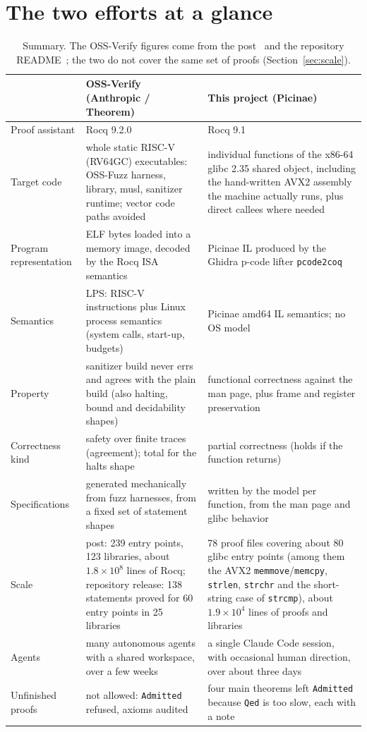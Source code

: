 \documentclass[11pt]{article}
\newcommand{\code}[1]{\texttt{#1}}
\begin{document}
\section{The two efforts at a glance}\label{sec:glance}

\begin{table}[h]
\centering\small
\begin{tabularx}{\textwidth}{@{}lXX@{}}
\toprule
 & OSS-Verify (Anthropic / Theorem) & This project (Picinae) \\
\midrule
Proof assistant & Rocq 9.2.0 & Rocq 9.1 \\
Target code & whole static RISC-V (RV64GC) executables: OSS-Fuzz harness, library, musl, sanitizer runtime; vector code paths avoided & individual functions of the x86-64 glibc 2.35 shared object, including the hand-written AVX2 assembly the machine actually runs, plus direct callees where needed \\
Program representation & ELF bytes loaded into a memory image, decoded by the Rocq ISA semantics & Picinae IL produced by the Ghidra p-code lifter \texttt{pcode2coq} \\
Semantics & LPS: RISC-V instructions plus Linux process semantics (system calls, start-up, budgets) & Picinae amd64 IL semantics; no OS model \\
Property & sanitizer build never errs and agrees with the plain build (also halting, bound and decidability shapes) & functional correctness against the man page, plus frame and register preservation \\
Correctness kind & safety over finite traces (agreement); total for the halts shape & partial correctness (holds if the function returns) \\
Specifications & generated mechanically from fuzz harnesses, from a fixed set of statement shapes & written by the model per function, from the man page and glibc behavior \\
Scale & post: 239 entry points, 123 libraries, about $1.8\times10^8$ lines of Rocq; repository release: 138 statements proved for 60 entry points in 25 libraries & 78 proof files covering about 80 glibc entry points (among them the AVX2 \code{memmove}/\code{memcpy}, \code{strlen}, \code{strchr} and the short-string case of \code{strcmp}), about $1.9\times10^4$ lines of proofs and libraries \\
Agents & many autonomous agents with a shared workspace, over a few weeks & a single Claude Code session, with occasional human direction, over about three days \\
Unfinished proofs & not allowed: \code{Admitted} refused, axioms audited & four main theorems left \code{Admitted} because \code{Qed} is too slow, each with a note \\
\bottomrule
\end{tabularx}
\caption{Summary.  The OSS-Verify figures come from the post~\cite{anthropic-post} and the repository README~\cite{oss-verify}; the two do not cover the same set of proofs (Section~\ref{sec:scale}).}
\end{table}
\end{document}
